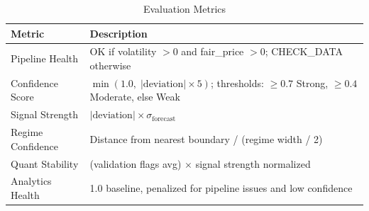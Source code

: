\documentclass[12pt,a4paper]{article}
\begin{document}
\begin{table}[H]
\centering
\caption{Evaluation Metrics}
\label{tab:eval_metrics}
\begin{tabularx}{\textwidth}{l X}
\toprule
\textbf{Metric} & \textbf{Description} \\
\midrule
Pipeline Health & OK if volatility $> 0$ and fair\_price $> 0$; CHECK\_DATA otherwise \\
Confidence Score & $\min(1.0,\; |\text{deviation}| \times 5)$; thresholds: $\geq 0.7$ Strong, $\geq 0.4$ Moderate, else Weak \\
Signal Strength & $|\text{deviation}| \times \sigma_\text{forecast}$ \\
Regime Confidence & Distance from nearest boundary / (regime width / 2) \\
Quant Stability & (validation flags avg) $\times$ signal strength normalized \\
Analytics Health & 1.0 baseline, penalized for pipeline issues and low confidence \\
\bottomrule
\end{tabularx}
\end{table}
\end{document}
